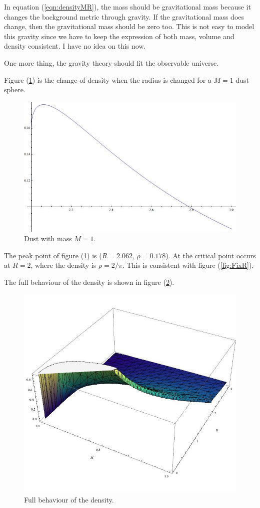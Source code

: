 \documentclass[12pt,a4paper]{article}
\begin{document}
In equation (\ref{eqn:densityMR}), the mass should be gravitational mass because it changes the background metric through gravity. If the gravitational mass does change, then the gravitational mass should be zero too. This is not easy to model this gravity since we have to keep the expression of both mass, volume and density consistent. I have no idea on this now.

One more thing, the gravity theory should fit the observable universe.

Figure (\ref{fig:FixM}) is the change of density when the radius is changed for a $M=1$ dust sphere.
\begin{figure}[!htbp]
\centering
\includegraphics[width=400pt]{DustBlackHole_FixM.jpg}
\caption{Dust with mass $M=1$.}\label{fig:FixM}
\end{figure}

The peak point of figure (\ref{fig:FixM}) is ($R=2.062$, $\rho=0.178$). At the critical point occurs at $R=2$, where the density is $\rho=2/\pi$. This is consistent with figure (\ref{fig:FixR}).



The full behaviour of the density is shown in figure (\ref{fig:3D}).
\begin{figure}[!htbp]
\centering
\includegraphics[width=400pt]{DustBlackHole_3D.jpg}
\caption{Full behaviour of the density.}\label{fig:3D}
\end{figure}
\end{document}
